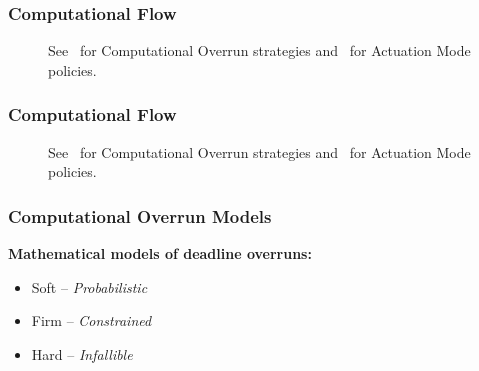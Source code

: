 \begin{frame}
    \frametitle{Computational Flow}
    \begin{figure}[h]
        \centering
        \caption{See~\parencite{Cervin:2005} for Computational Overrun strategies and~\parencite{Schenato:2009} for Actuation Mode policies.}
    \end{figure}
\end{frame}

\begin{frame}
    \frametitle{Computational Flow}
    \begin{figure}[h]
        \centering
        \caption{See~\parencite{Cervin:2005} for Computational Overrun strategies and~\parencite{Schenato:2009} for Actuation Mode policies.}
    \end{figure}
\end{frame}

\begin{frame}
    \frametitle{Computational Overrun Models}
    \textbf{Mathematical models of deadline overruns:}
    \begin{itemize}
        \item \textcolor<2>{lqgcolour!50!white}{Soft -- \emph{Probabilistic}~\parencite{Buttazzo:2005, Manolache:2004, vonderBrueggen:2021}}
        \item \textcolor<2>{lqgcolour}{Firm -- \emph{Constrained}~\parencite{Koren:1995, Bernat:2001}}
        \item<1> Hard -- \emph{Infallible}~\parencite{Liu:1973}
    \end{itemize}
\end{frame}

